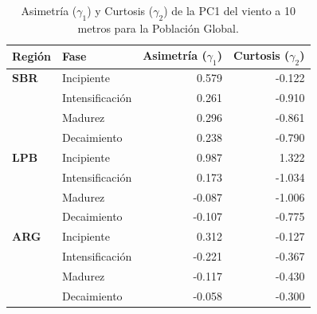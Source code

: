 \begin{table}[htbp]
\centering
\caption[Asimetría y Curtosis de la PC1 del viento a 10 m - Población Global]{Asimetría ($\gamma_1$) y Curtosis ($\gamma_2$) de la PC1 del viento a 10 metros para la Población Global.}
\label{tab:momentos_global_w10}
\begin{tabular*}{\textwidth}{@{\extracolsep{\fill}}llrr}
\hline
\textbf{Región} & \textbf{Fase} & \textbf{Asimetría ($\gamma_1$)} & \textbf{Curtosis ($\gamma_2$)} \\
\hline
\textbf{SBR} & Incipiente & 0.579 & -0.122 \\
 & Intensificación & 0.261 & -0.910 \\
 & Madurez & 0.296 & -0.861 \\
 & Decaimiento & 0.238 & -0.790 \\
\hline
\textbf{LPB} & Incipiente & 0.987 & 1.322 \\
 & Intensificación & 0.173 & -1.034 \\
 & Madurez & -0.087 & -1.006 \\
 & Decaimiento & -0.107 & -0.775 \\
\hline
\textbf{ARG} & Incipiente & 0.312 & -0.127 \\
 & Intensificación & -0.221 & -0.367 \\
 & Madurez & -0.117 & -0.430 \\
 & Decaimiento & -0.058 & -0.300 \\
\hline
\end{tabular*}
\end{table}